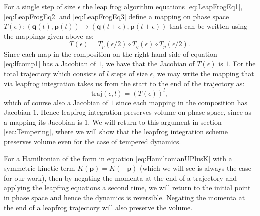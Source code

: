 \documentclass[12pt]{article}
\begin{document}
            For a single step of size $\epsilon$ the leap frog algorithm equations \ref{eq:LeapFrogEq1}, \ref{eq:LeapFrogEq2} and \ref{eq:LeapFrogEq3} define a mapping on phase space $T\left(\epsilon\right): \left(\bm{q}\left(t\right),\bm{p}\left(t\right)\right) \rightarrow \left(\bm{q}\left(t+\epsilon\right),\bm{p}\left(t+\epsilon\right)\right)$ that can be written using the mappings given above as:
            \begin{equation}
                \label{eq:lfcomp1}
                T\left(\epsilon\right)=T_p\left(\epsilon/2\right)\circ T_q\left(\epsilon\right)\circ T_p\left(\epsilon/2\right).
            \end{equation}
            Since each map in the composition on the right hand side of equation \ref{eq:lfcomp1} has a Jacobian of $1$, we have that the Jacobian of $T\left(\epsilon\right)$ is $1$. For the total trajectory which consists of $l$ steps of size $\epsilon$, we may write the mapping that via leapfrog integration takes us from the start to the end of the trajectory as:
            \begin{equation}
                \text{traj}\left(\epsilon,l\right) = \left(T\left(\epsilon\right)\right)^l,
            \end{equation}
            which of course also a Jacobian of $1$ since each mapping in the composition has Jacobian $1$. Hence leapfrog integration preserves volume on phase space, since as a mapping its Jacobian is $1$. We will return to this argument in section \ref{sec:Tempering}, where we will show that the leapfrog integration scheme preserves volume even for the case of tempered dynamics. 
            
            For a Hamiltonian of the form in equation \ref{eq:HamiltonianUPlusK} with a symmetric kinetic term $K\left(\bm{p}\right)=K\left(-\bm{p}\right)$ (which we will see is always the case for our work), then by negating the momenta at the end of a trajectory and applying the leapfrog equations a second time, we will return to the initial point in phase space and hence the dynamics is reversible. Negating the momenta at the end of a leapfrog trajectory will also preserve the volume.



        
\end{document}
